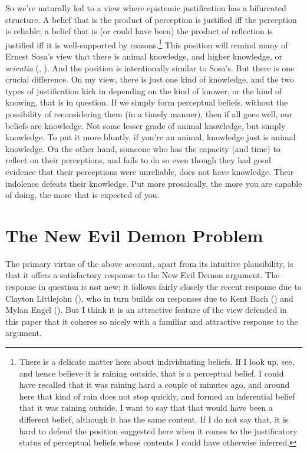 \documentclass[
  11pt,
  letterpaper,
  DIV=11,
  numbers=noendperiod,
  twoside]{scrartcl}
\begin{document}
So we're naturally led to a view where epistemic justification has a
bifurcated structure. A belief that is the product of perception is
justified iff the perception is reliable; a belief that is (or could
have been) the product of reflection is justified iff it is
well-supported by reasons.\footnote{There is a delicate matter here
  about individuating beliefs. If I look up, see, and hence believe it
  is raining outside, that is a perceptual belief. I could have recalled
  that it was raining hard a couple of minutes ago, and around here that
  kind of rain does not stop quickly, and formed an inferential belief
  that it was raining outside. I want to say that that would have been a
  different belief, although it has the same content. If I do not say
  that, it is hard to defend the position suggested here when it comes
  to the justificatory status of perceptual beliefs whose contents I
  could have otherwise inferred.} This position will remind many of
Ernest Sosa's view that there is animal knowledge, and higher knowledge,
or \emph{scientia} (,
). And the position is intentionally
similar to Sosa's. But there is one crucial difference. On my view,
there is just one kind of knowledge, and the two types of justification
kick in depending on the kind of knower, or the kind of knowing, that is
in question. If we simply form perceptual beliefs, without the
possibility of reconsidering them (in a timely manner), then if all goes
well, our beliefs are knowledge. Not some lesser grade of animal
knowledge, but simply knowledge. To put it more bluntly, if you're an
animal, knowledge just is animal knowledge. On the other hand, someone
who has the capacity (and time) to reflect on their perceptions, and
fails to do so even though they had good evidence that their perceptions
were unreliable, does not have knowledge. Their indolence defeats their
knowledge. Put more prosaically, the more you are capable of doing, the
more that is expected of you.

\section{The New Evil Demon Problem}\label{the-new-evil-demon-problem}

The primary virtue of the above account, apart from its intuitive
plausibility, is that it offers a satisfactory response to the New Evil
Demon argument. The response in question is not new; it follows fairly
closely the recent response due to Clayton Littlejohn
(), who in turn builds on responses
due to Kent Bach () and Mylan Engel
(). But I think it is an attractive
feature of the view defended in this paper that it coheres so nicely
with a familiar and attractive response to the argument.
\end{document}
